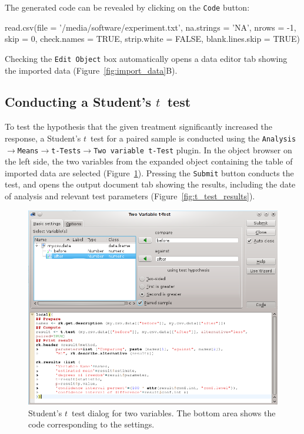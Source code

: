 The generated  code can be revealed by clicking on the \texttt{Code} button:

\begin{Code}
read.csv(file = '/media/software/experiment.txt',
         na.strings = 'NA', nrows = -1, skip = 0,
         check.names = TRUE, strip.white = FALSE, blank.lines.skip = TRUE)
\end{Code}

Checking the \texttt{Edit Object} box automatically opens a data editor tab
showing the imported data (Figure~\ref{fig:import_data}B).

\subsection[Conducting a Student's t-test]{Conducting a Student's $t$~test}
\label{sec:conducting_ttest}
To test the hypothesis that the given treatment significantly increased the response, a Student's
$t$~test for a paired sample is conducted using the
\texttt{Analysis$\rightarrow$Means$\rightarrow$t-Tests$\rightarrow$Two variable t-Test} plugin.
In the object browser on the left side, the two variables from the expanded
 object containing the table of imported data 
are selected (Figure~\ref{fig:t_test_dialog}). 
Pressing the \texttt{Submit} button conducts the test, and opens the output document tab
showing the results, including the date of analysis and relevant test parameters (Figure~\ref{fig:t_test_results}).

\begin{figure}[b!]
 \centering
 \includegraphics[width=13.5cm]{./figures/t-test_dialog.png}
 \caption{Student's $t$~test dialog for two variables. The bottom area shows the  code corresponding to the settings.}
 \label{fig:t_test_dialog}
\end{figure}

